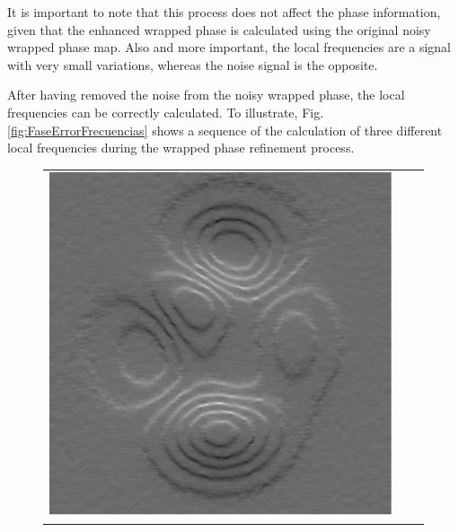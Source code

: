 It is important to note that this process does not affect the phase information,
given that the enhanced wrapped phase is calculated using the original noisy
wrapped phase map. Also and more important, the local frequencies are a signal
with very small variations,  whereas the noise signal is the opposite.

After having removed the noise from the noisy wrapped phase, the local
frequencies can be correctly calculated. To illustrate, Fig.
\ref{fig:FaseErrorFrecuencias} shows a sequence of the calculation of three
different local frequencies during the wrapped phase refinement process.

\begin{figure}[Ht!]
  \begin{center}
    \begin{tabular}{c c c}
      \includegraphics[scale=0.45]{Chpt4_figures/Fig_frecuencias1.eps}&

\end{tabular}
\end{center}
\end{figure}
